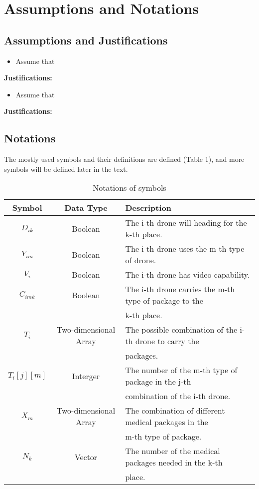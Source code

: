 \MinParskip{}
\section{Assumptions and Notations}
\subsection{Assumptions and Justifications} 

\begin{itemize}
    \item Assume that 
\end{itemize}

\textbf{Justifications: }

\begin{itemize}
    \item Assume that 
\end{itemize}

\textbf{Justifications: }


\subsection{Notations}
The mostly used symbols and their definitions are defined (Table 1), and more symbols will be defined later in the text. 
\begin{table}[h] \centering
    \caption{Notations of symbols}
    \begin{tabular}{ccl}
        \toprule
        Symbol & Data Type & Description\\ \hline
        $D_{ik}$ & Boolean & The i-th drone will heading for the k-th place. \\
        $Y_{im}$ & Boolean & The i-th drone uses the m-th type of drone. \\
        $V_i$ & Boolean & The i-th drone has video capability. \\
        $C_{imk}$ & Boolean & The i-th drone carries the m-th type of package to the\\ & & k-th place.\\
        $T_i$ & Two-dimensional Array & The possible combination of the i-th drone to carry the\\ & &packages.\\
        $T_i[j][m]$ & Interger & The number of the m-th type of package in the j-th\\ & & combination of the i-th drone.\\
        $X_m$ & Two-dimensional Array & The combination of different medical packages in the\\ & & m-th type of package. \\
        $N_k$ & Vector & The number of the medical packages needed in the k-th \\ & & place.\\
        \bottomrule
    \end{tabular}
\end{table}